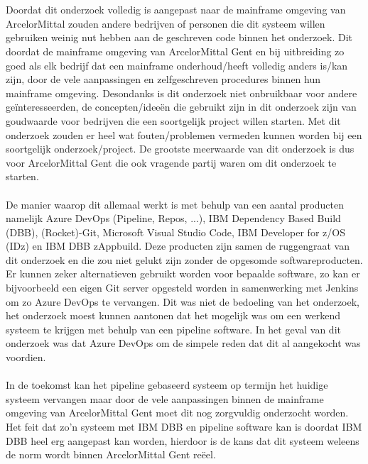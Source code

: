 \\ \\
Doordat dit onderzoek volledig is aangepast naar de mainframe omgeving van ArcelorMittal zouden andere bedrijven of personen die dit systeem willen gebruiken weinig nut hebben aan de geschreven code binnen het onderzoek. Dit doordat de mainframe omgeving van ArcelorMittal Gent en bij uitbreiding zo goed als elk bedrijf dat een mainframe onderhoud/heeft volledig anders is/kan zijn, door de vele aanpassingen en zelfgeschreven procedures binnen hun mainframe omgeving. Desondanks is dit onderzoek niet onbruikbaar voor andere geïnteresseerden, de concepten/ideeën die gebruikt zijn in dit onderzoek zijn van goudwaarde voor bedrijven die een soortgelijk project willen starten. Met dit onderzoek zouden er heel wat fouten/problemen vermeden kunnen worden bij een soortgelijk onderzoek/project. De grootste meerwaarde van dit onderzoek is dus voor ArcelorMittal Gent die ook vragende partij waren om dit onderzoek te starten. 
\\ \\
De manier waarop dit allemaal werkt is met behulp van een aantal producten namelijk Azure DevOps (Pipeline, Repos, ...), IBM Dependency Based Build (DBB), (Rocket)-Git, Microsoft Visual Studio Code, IBM Developer for z/OS (IDz) en IBM DBB zAppbuild. Deze producten zijn samen de ruggengraat van dit onderzoek en die zou niet gelukt zijn zonder de opgesomde softwareproducten. Er kunnen zeker alternatieven gebruikt worden voor bepaalde software, zo kan er bijvoorbeeld een eigen Git server opgesteld worden in samenwerking met Jenkins om zo Azure DevOps te vervangen. Dit was niet de bedoeling van het onderzoek, het onderzoek moest kunnen aantonen dat het mogelijk was om een werkend systeem te krijgen met behulp van een pipeline software. In het geval van dit onderzoek was dat Azure DevOps om de simpele reden dat dit al aangekocht was voordien. 
\\ \\
In de toekomst kan het pipeline gebaseerd systeem op termijn het huidige systeem vervangen maar door de vele aanpassingen binnen de mainframe omgeving van ArcelorMittal Gent moet dit nog zorgvuldig onderzocht worden. Het feit dat zo'n systeem met IBM DBB en pipeline software kan is doordat IBM DBB heel erg aangepast kan worden, hierdoor is de kans dat dit systeem weleens de norm wordt binnen ArcelorMittal Gent reëel.



